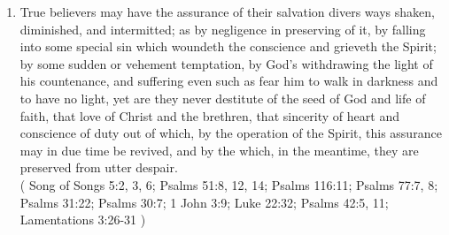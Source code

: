 \documentclass[12pt,a4paper]{book}
\begin{document}
\begin{enumerate}
\item True believers may have the assurance of their salvation divers ways shaken, diminished, and intermitted; as by negligence in preserving of it, by falling into some special sin which woundeth the conscience and grieveth the Spirit; by some sudden or vehement temptation, by God's withdrawing the light of his countenance, and suffering even such as fear him to walk in darkness and to have no light, yet are they never destitute of the seed of God and life of faith, that love of Christ and the brethren, that sincerity of heart and conscience of duty out of which, by the operation of the Spirit, this assurance may in due time be revived, and by the which, in the meantime, they are preserved from utter despair.\\
( Song of Songs 5:2, 3, 6; Psalms 51:8, 12, 14; Psalms 116:11; Psalms 77:7, 8; Psalms 31:22; Psalms 30:7; 1 John 3:9; Luke 22:32; Psalms 42:5, 11; Lamentations 3:26-31 )
\end{enumerate}
\end{document}
